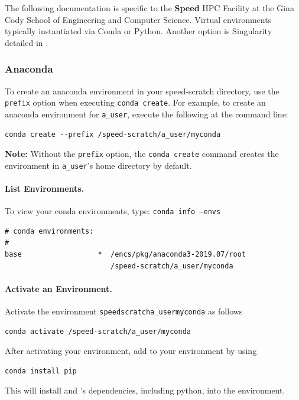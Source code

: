 \documentclass{easychair}
\begin{document}
The following documentation is specific to the \textbf{Speed} HPC Facility at the
Gina Cody School of Engineering and Computer Science.
%
Virtual environments typically instantiated via Conda or Python.
Another option is Singularity detailed in .

\subsubsection{Anaconda}
\label{sect:conda-venv}

To create an anaconda environment in your speed-scratch directory, use the \texttt{\-\-prefix} 
option when executing \texttt{conda create}. For example, to create an anaconda environment for 
\texttt{a\_user}, execute the following at the command line:

\begin{verbatim}
conda create --prefix /speed-scratch/a_user/myconda
\end{verbatim}

\vspace{10pt}
\noindent
\textbf{Note:} Without the \texttt{\-\-prefix} option, the \texttt{conda create} command creates the 
environment in \texttt{a\_user}'s home directory by default.
\vspace{10pt}

\paragraph{List Environments.}

To view your conda environments, type: \texttt{conda info --envs}

\begin{verbatim}
# conda environments:
#
base                  *  /encs/pkg/anaconda3-2019.07/root
                         /speed-scratch/a_user/myconda
\end{verbatim}      

\paragraph{Activate an Environment.}

Activate the environment \texttt{\/speed\-scratch\/a\_user\/myconda} as follows
\begin{verbatim}
conda activate /speed-scratch/a_user/myconda
\end{verbatim}
After activating your environment, add  to your environment by using 
\begin{verbatim}
conda install pip
\end{verbatim}
This will install  and 's dependencies, including python, 
into the environment.
\end{document}
